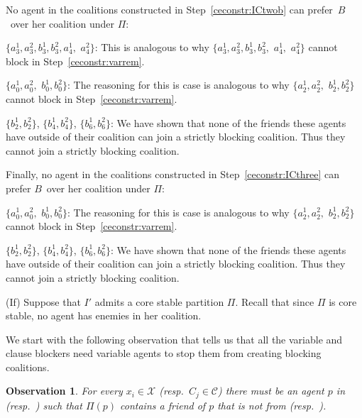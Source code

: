 \documentclass[a4paper,fleqn]{cas-sc}
\newcommand{\partition}{\ensuremath{\Pi}\xspace}
\newcommand{\blockingCoalition}{\ensuremath{B}\xspace}
\newcommand{\ii}{\ensuremath{{i}}}
\newcommand{\cia}{\ensuremath{{j}}}
\newtheorem{obs}{Observation}
\newcommand{\vars}{\mathcal{X}}
\newcommand{\clas}{\mathcal{C}}
\begin{document}
{No agent in the coalitions constructed in Step~\eqref{ceconstr:ICtwob} can prefer~\blockingCoalition\ over her coalition under \partition:
\begin{compactitem}
\item $\{a^1_{3}, a^2_{3}, b^1_{3}, b^2_{3}, a^1_{4},$ $ a^2_{4}\}$: This is analogous to why $\{a^1_{3}, a^2_{3}, b^1_{3}, b^2_{3},$ $a^1_{4},$ $ a^2_{4}\}$ cannot block in Step~\eqref{ceconstr:varrem}.
\item $\{a^1_{0}, a^2_{0},$ $b^1_{0}, b^2_{0}\}$: The reasoning for this is case is analogous to why $\{a^1_{2}, a^2_{2},$ $b^1_{2}, b^2_{2}\}$ cannot block in Step~\eqref{ceconstr:varrem}. 
\item $\{b^1_{2}, b^2_{2}\}$, $\{b^1_{4}, b^2_{4}\}$, $\{b^1_{6}, b^2_{6}\}$:  We have shown that none of the friends these agents have outside of their coalition can join a strictly blocking coalition. Thus they cannot join a strictly blocking coalition.
\end{compactitem}

Finally, no agent in the coalitions constructed in Step~\eqref{ceconstr:ICthree} can prefer \blockingCoalition\ over her coalition under \partition:
\begin{compactitem}
\item $\{a^1_{0}, a^2_{0},$ $b^1_{0}, b^2_{0}\}$: The reasoning for this is case is analogous to why $\{a^1_{2}, a^2_{2},$ $b^1_{2}, b^2_{2}\}$ cannot block in Step~\eqref{ceconstr:varrem}. 
\item $\{b^1_{2}, b^2_{2}\}$, $\{b^1_{4}, b^2_{4}\}$, $\{b^1_{6}, b^2_{6}\}$:  We have shown that none of the friends these agents have outside of their coalition can join a strictly blocking coalition. Thus they cannot join a strictly blocking coalition.
\end{compactitem}

(If) Suppose that $I'$ admits a core stable partition \partition.
Recall that since $\partition$ is core stable, no agent has enemies in her coalition.

We start with the following observation that tells us that all the variable and clause blockers need variable agents to stop them from creating blocking coalitions.

\begin{obs}\label{clm:blockerreq}
For every $x_\ii \in \vars$  (resp.\ $C_\cia \in \clas$) there must be an agent $p$ in \Ix{\ii} (resp.\ \Ic{\cia}) such that $\partition(p)$ contains a friend of $p$ that is not from \Ix{\ii} (resp.\ \Ic{\cia}).
\end{obs}

}
\end{document}
